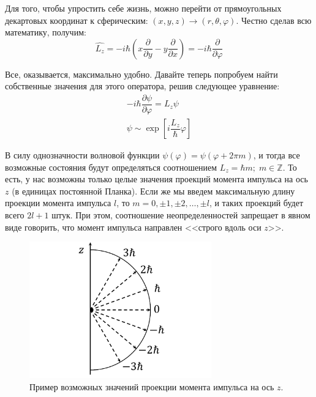 \documentclass[12pt]{article}
\begin{document}
Для того, чтобы упростить себе жизнь, можно перейти от прямоугольных декартовых координат к сферическим: $(x,y,z) \rightarrow (r, \theta, \varphi)$. Честно сделав всю математику, получим:
\begin{equation}
    \hat{L_z} = -i\hbar\left(x\dfrac{\partial}{\partial y} - y\dfrac{\partial}{\partial x}\right)= -i\hbar\dfrac{\partial}{\partial \varphi}
\end{equation}

Все, оказывается, максимально удобно. Давайте теперь попробуем найти собственные значения для этого оператора, решив следующее уравнение:
\begin{gather*}
     -i\hbar\dfrac{\partial \psi}{\partial \varphi} = L_z \psi\\
     \psi \sim \exp{\left[i\dfrac{L_z}{\hbar} \varphi \right]}
\end{gather*}

В силу однозначности волновой функции $\psi(\varphi) = \psi(\varphi + 2\pi m)$, и тогда все возможные состояния будут определяться соотношением $L_z =\hbar m;\; m \in \mathbb{Z}$. То есть, у нас возможны только целые значения проекций момента импульса на ось $z$ (в единицах постоянной Планка). Если же мы введем максимальную длину проекции момента  импульса $l$, то $m = 0, \pm 1, \pm 2, \dots, \pm l$, и таких проекций будет всего $2l+1$ штук. При этом, соотношение неопределенностей запрещает в явном виде говорить, что момент импульса направлен <<строго вдоль оси $z$>>.

\begin{figure}[h]
    \centering
    \includegraphics[width=0.7\textwidth,height=\textheight,keepaspectratio]{Seminar_06/pics/pic_01.pdf}
    \caption{Пример возможных значений проекции момента импульса на ось $z$.}
    \label{fig:sem_06_momet_projection}
\end{figure}
\end{document}
